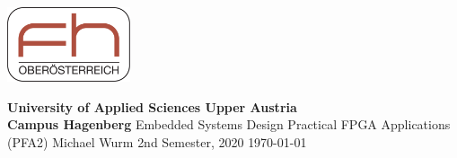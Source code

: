 \thispagestyle{empty} %
\hfill
\includegraphics[height=2.2cm]{./img/fhooe-logo}

\begin{center}
	\textbf{\Large }
	\linebreak
	\linebreak
	\horizontalLine{0.5 mm}
	\linebreak
	\linebreak
	\textbf{\huge \UebungNr}
	\linebreak
	\linebreak
	\linebreak
	\LARGE \UebungTopic
	\linebreak
	\linebreak
	\horizontalLine{0.5 mm}
	\linebreak
	\linebreak
	\linebreak
	\linebreak
	\linebreak
	\Large {\textbf{University of Applied Sciences Upper Austria\\
									Campus Hagenberg}}
	\linebreak
	\linebreak
	\Large { Embedded Systems Design }
	\linebreak
	\linebreak
	\Large { Practical FPGA Applications (PFA2) }
	\linebreak
	\linebreak
	\linebreak
	\linebreak
	\linebreak
	\linebreak
	\Large {Michael Wurm }
	\linebreak
	\linebreak
	\linebreak
	\linebreak
	\linebreak
	\linebreak
	\normalsize{ 2nd Semester, 2020 }
	\linebreak
	\linebreak
	\large{\today}

\end{center}

